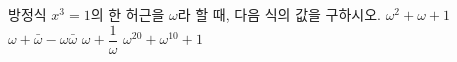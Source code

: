 방정식 $x^3=1$의 한 허근을 $\omega$라 할 때, 다음 식의 값을 구하시오. 
 $\omega^2+\omega+1$
 $\omega+\bar{\omega}-\omega\bar{\omega}$
 $\omega+\dfrac{1}{\omega}$
 $\omega^{20}+\omega^{10}+1$
